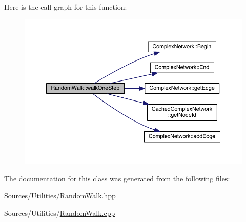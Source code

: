 Here is the call graph for this function\+:\nopagebreak
\begin{figure}[H]
\begin{center}
\leavevmode
\includegraphics[width=350pt]{class_random_walk_a17eddb07d64f4ad98649605be957dde9_cgraph}
\end{center}
\end{figure}




The documentation for this class was generated from the following files\+:\begin{DoxyCompactItemize}
\item 
Sources/\+Utilities/\hyperlink{_random_walk_8hpp}{Random\+Walk.\+hpp}\item 
Sources/\+Utilities/\hyperlink{_random_walk_8cpp}{Random\+Walk.\+cpp}\end{DoxyCompactItemize}
